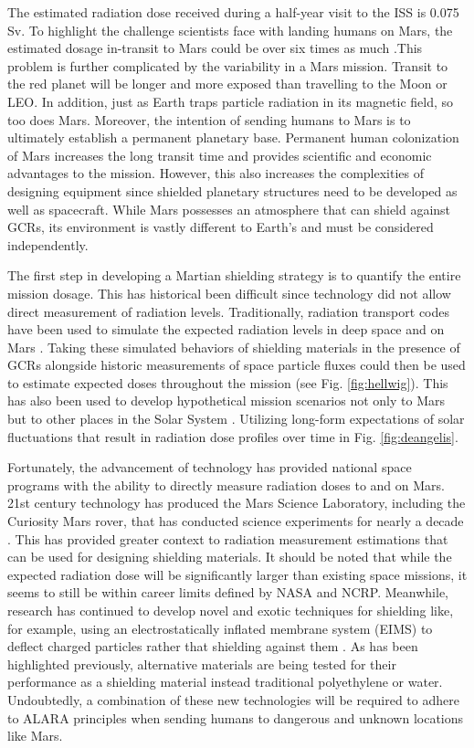 The estimated radiation dose received during a half-year visit to the ISS is 0.075 Sv. To highlight the challenge scientists face with landing humans on Mars, the estimated dosage in-transit to Mars could be over six times as much \cite{kerr-mars}.This problem is further complicated by the variability in a Mars mission. Transit to the red planet will be longer and more exposed than travelling to the Moon or LEO. In addition, just as Earth traps particle radiation in its magnetic field, so too does Mars. Moreover, the intention of sending humans to Mars is to ultimately establish a permanent planetary base. Permanent human colonization of Mars increases the long transit time and provides scientific and economic advantages to the mission. However, this also increases the complexities of designing equipment since shielded planetary structures need to be developed as well as spacecraft. While Mars possesses an atmosphere that can shield against GCRs, its environment is vastly different to Earth’s and must be considered independently.

The first step in developing a Martian shielding strategy is to quantify the entire mission dosage. This has historical been difficult since technology did not allow direct measurement of radiation levels. Traditionally, radiation transport codes have been used to simulate the expected radiation levels in deep space and on Mars \cite{simonsen-transport}. Taking these simulated behaviors of shielding materials in the presence of GCRs alongside historic measurements of space particle fluxes could then be used to estimate expected doses throughout the mission (see Fig. \ref{fig:hellwig}). This has also been used to develop hypothetical mission scenarios not only to Mars but to other places in the Solar System \cite{deangelis-scenarios}. Utilizing long-form expectations of solar fluctuations that result in radiation dose profiles over time in Fig. \ref{fig:deangelis}.

Fortunately, the advancement of technology has provided national space programs with the ability to directly measure radiation doses to and on Mars. 21st century technology has produced the Mars Science Laboratory, including the Curiosity Mars rover, that has conducted science experiments for nearly a decade \cite{durante}. This has provided greater context to radiation measurement estimations that can be used for designing shielding materials. It should be noted that while the expected radiation dose will be significantly larger than existing space missions, it seems to still be within career limits defined by NASA and NCRP. Meanwhile, research has continued to develop novel and exotic techniques for shielding like, for example, using an electrostatically inflated membrane system (EIMS) to deflect charged particles rather that shielding against them \cite{tripathi}. As has been highlighted previously, alternative materials are being tested for their performance as a shielding material instead traditional polyethylene or water. Undoubtedly, a combination of these new technologies will be required to adhere to ALARA principles when sending humans to dangerous and unknown locations like Mars.


